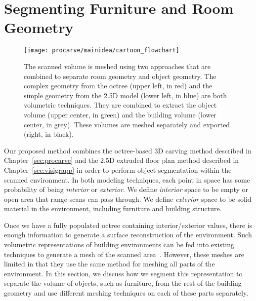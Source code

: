 \documentclass[12pt,onecolumn,oneside]{book}
\begin{document}
\FloatBarrier
\section{Segmenting Furniture and Room Geometry}
\label{sec:procarve_main_idea}

\begin{figure}[t]
	\centerline{\texttt{[image: procarve/mainidea/cartoon\_flowchart]}}
	\caption[Diagram showing how models are used to segment objects in scene.]{The scanned volume is meshed using two approaches that are combined to separate room geometry and object geometry.  The complex geometry from the octree (upper left, in red) and the simple geometry from the 2.5D model (lower left, in blue) are both volumetric techniques.  They are combined to extract the object volume (upper center, in green) and the building volume (lower center, in grey).  These volumes are meshed separately and exported (right, in black).}
	\label{fig:procarve_mainidea}
\end{figure}

Our proposed method combines the octree-based 3D carving method described in Chapter~\ref{sec:procarve} and the 2.5D extruded floor plan method described in Chapter~\ref{sec:visigrapp} in order to perform object segmentation within the scanned environment.  In both modeling techniques, each point in space has some probability of being {\it interior} or {\it exterior}.  We define {\it interior} space to be empty or open area that range scans can pass through.  We define {\it exterior} space to be solid material in the environment, including furniture and building structure.

Once we have a fully populated octree containing interior/exterior values, there is enough information to generate a surface reconstruction of the environment.  Such volumetric representations of building environments can be fed into existing techniques to generate a mesh of the scanned area~\cite{Turner13,Kintinuous,Carving}.  However, these meshes are limited in that they use the same method for meshing all parts of the environment.  In this section, we discuss how we segment this representation to separate the volume of objects, such as furniture, from the rest of the building geometry and use different meshing techniques on each of these parts separately.
\end{document}
